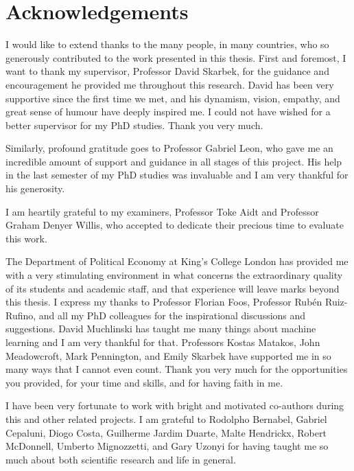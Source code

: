 \documentclass[a4paper,12pt]{report}
\newcommand{\linespacing}{2}
\renewcommand{\baselinestretch}{\linespacing}
\begin{document}
\chapter*{Acknowledgements}
\renewcommand{\baselinestretch}{\linespacing}
\small\normalsize

I would like to extend thanks to the many people, in many countries, who so generously contributed to the work presented in this thesis. First and foremost, I want to thank my supervisor, Professor David Skarbek, for the guidance and encouragement he provided me throughout this research. David has been very supportive since the first time we met, and his dynamism, vision, empathy, and great sense of humour have deeply inspired me. I could not have wished for a better supervisor for my PhD studies. Thank you very much.

Similarly, profound gratitude goes to Professor Gabriel Leon, who gave me an incredible amount of support and guidance in all stages of this project. His help in the last semester of my PhD studies was invaluable and I am very thankful for his generosity.

I am heartily grateful to my examiners, Professor Toke Aidt and Professor Graham Denyer Willis, who accepted to dedicate their precious time to evaluate this work.

The Department of Political Economy at King's College London has provided me with a very stimulating environment in what concerns the extraordinary quality of its students and  academic staff, and that experience will leave marks beyond this thesis. I express my thanks to Professor Florian Foos, Professor Rubén Ruiz-Rufino, and all my PhD colleagues for the inspirational discussions and suggestions. David Muchlinski has taught me many things about machine learning and I am very thankful for that. Professors Kostas Matakos, John Meadowcroft, Mark Pennington, and Emily Skarbek have supported me in so many ways that I cannot even count. Thank you very much for the opportunities you provided, for your time and skills, and for having faith in me.

I have been very fortunate to work with bright and motivated co-authors during this and other related projects. I am grateful to Rodolpho Bernabel, Gabriel Cepaluni, Diogo Costa, Guilherme Jardim Duarte, Malte Hendrickx, Robert McDonnell, Umberto Mignozzetti, and Gary Uzonyi for having taught me so much about both scientific research and life in general.
\end{document}
